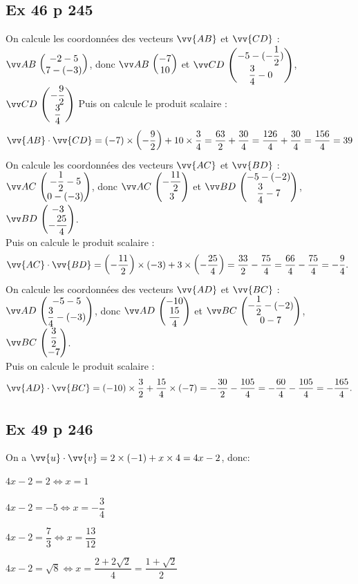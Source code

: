 \documentclass[12pt,a4paper]{book}
\begin{document}
\subsection*{Ex 46 p 245}

    On calcule les coordonnées des vecteurs $\vv{A B}$ et $\vv{C D}$ :\\
    $\Coord{AB}{-2-5}{7-(-3)}$, donc $\Coord{AB}{-7}{10}$ et $\Coord{CD}{-5-(-\dfrac{1}{2})}{\dfrac{3}{4}-0}$, $\Coord{CD}{-\dfrac{9}{2}}{\dfrac{3}{4}}$
Puis on calcule le produit scalaire :
$$
\vv{A B} \cdot \vv{C D}=(-7) \times\left(-\frac{9}{2}\right)+10 \times \frac{3}{4}=\frac{63}{2}+\frac{30}{4}=\frac{126}{4}+\frac{30}{4}=\frac{156}{4}=39
$$
On calcule les coordonnées des vecteurs $\vv{A C}$ et $\vv{B D}$ :\\
$\Coord{AC}{-\dfrac{1}{2}-5}{0-(-3)}$, donc $\Coord{AC}{-\dfrac{11}{2}}{3}$ et $\Coord{BD}{-5-(-2)}{\dfrac{3}{4}-7}$, $\Coord{BD}{-3}{-\dfrac{25}{4}}$.\\
Puis on calcule le produit scalaire :
$$
\vv{A C} \cdot \vv{B D}=\left(-\frac{11}{2}\right) \times(-3)+3 \times\left(-\frac{25}{4}\right)=\frac{33}{2}-\frac{75}{4}=\frac{66}{4}-\frac{75}{4}=-\frac{9}{4} \text {. }
$$
On calcule les coordonnées des vecteurs $\vv{A D}$ et $\vv{B C}$ :\\
$\Coord{AD}{-5-5}{\dfrac{3}{4}-(-3)}$, donc $\Coord{AD}{-10}{\dfrac{15}{4}}$ et $\Coord{BC}{-\dfrac{1}{2}-(-2)}{0-7}$, $\Coord{BC}{\dfrac{3}{2}}{-7}$.\\
Puis on calcule le produit scalaire :
$$\vv{A D} \cdot \vv{B C}=(-10) \times \frac{3}{2}+\frac{15}{4}\times(-7)=-\frac{30}{2}-\frac{105}{4}=-\frac{60}{4}-\frac{105}{4}=-\frac{165}{4} .$$

\subsection*{Ex 49 p 246}
On a $ \vv{u} \cdot  \vv{v}=2 \times(-1)+x \times 4=4 x-2$, donc:
\begin{enumMet}
    \item $4 x-2=2 \Longleftrightarrow x=1$
    \item $4 x-2=-5 \Longleftrightarrow x=-\dfrac{3}{4}$
    \item $4 x-2=\dfrac{7}{3} \Longleftrightarrow x=\dfrac{13}{12}$
    \item $4 x-2=\sqrt{8} \Longleftrightarrow x=\dfrac{2+2 \sqrt{2}}{4}=\dfrac{1+\sqrt{2}}{2}$
\end{enumMet}
\end{document}
